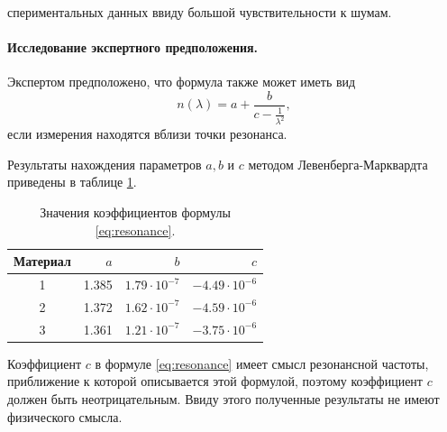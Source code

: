 \documentclass[12pt,a4paper]{article}
\theoremstyle{definition}
\begin{document}
спериментальных данных ввиду большой чувствительности
к шумам.

\paragraph{Исследование экспертного предположения.}

Экспертом предположено, что формула также может иметь вид
\begin{equation}
  n(\lambda) = a + \frac{b}{c - \frac{1}{\lambda^2}},
  \label{eq:resonance}
\end{equation}
если измерения находятся вблизи точки резонанса.

Результаты нахождения параметров $a, b$ и $c$ методом Левенберга-Марквардта
приведены в таблице \ref{tabl:resonance_coeffs}.

\begin{table}[h]
  \centering
  \begin{tabular}{| c | r | r | r |} \hline
	Материал	& $a$		& $b$					& $c$					\\ \hline
	1			& 1.385		& $1.79 \cdot 10^{-7}$	& $-4.49 \cdot 10^{-6}$	\\ \hline
	2			& 1.372		& $1.62 \cdot 10^{-7}$	& $-4.59 \cdot 10^{-6}$	\\ \hline
	3			& 1.361		& $1.21 \cdot 10^{-7}$	& $-3.75 \cdot 10^{-6}$	\\ \hline
  \end{tabular}
  \caption{Значения коэффициентов формулы \eqref{eq:resonance}.}
  \label{tabl:resonance_coeffs}
\end{table}

Коэффициент $c$ в формуле \eqref{eq:resonance} имеет смысл резонансной
частоты, приближение к которой описывается этой формулой, поэтому коэффициент
$c$ должен быть неотрицательным. Ввиду этого полученные результаты не
имеют физического смысла.
\end{document}

